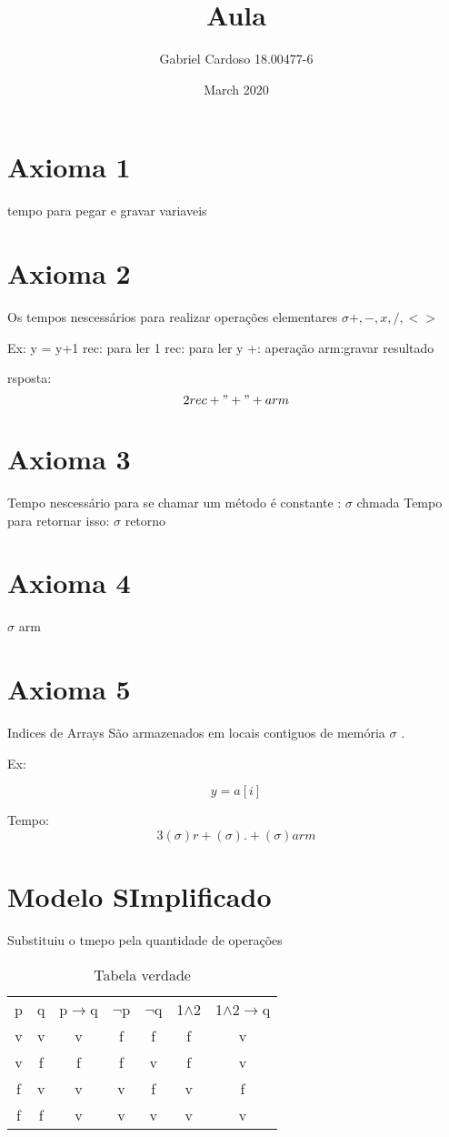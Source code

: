 \documentclass{article}
\title{Aula}
\author{Gabriel Cardoso 18.00477-6}
\date{March 2020}
\begin{document}
\maketitle

\section{Axioma 1}
tempo para pegar e gravar variaveis

\section{Axioma 2}
Os tempos nescessários para realizar operações elementares
$\sigma +,-,x,/,<>$


Ex:
y = y+1
rec: para ler 1
rec: para ler y
+: aperação
arm:gravar resultado

rsposta: \[2rec + "+" + arm \]

\section{Axioma 3}
Tempo nescessário para se chamar um método é constante : $\sigma$ chmada
Tempo para retornar isso: $\sigma$ retorno

\section{Axioma 4}
$\sigma$  arm

\section{Axioma 5}
Indices de Arrays
São armazenados em locais contiguos de memória
$\sigma$ .

Ex: 

\[y = a[i] \]

Tempo: \[ 3(\sigma)r+(\sigma).+(\sigma)arm \]

\section{Modelo SImplificado}
Substituiu o tmepo pela quantidade de operações

\begin{table}
    \caption{Tabela verdade}
    \begin{tabular}{c|c|c|c|c|c|c}
        p & q & p$\rightarrow$q & $\neg$p & $\neg$q & 1$\wedge$2 & 1$\wedge$2$\rightarrow$q\\
        v & v & v & f & f & f & v\\
        v & f & f & f & v & f & v\\
        f & v & v & v & f & v & f\\
        f & f & v & v & v & v & v
    \end{tabular}

\end{table}
\end{document}
